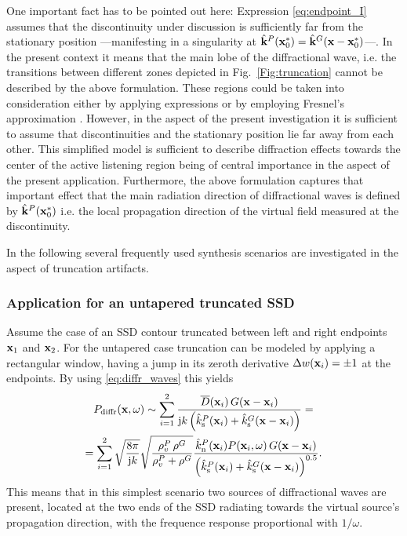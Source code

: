 \documentclass[lettersize,journal]{IEEEtran}
\begin{document}
One important fact has to be pointed out here: 
Expression \eqref{eq:endpoint_I} assumes that the discontinuity under discussion is sufficiently far from the stationary position ---manifesting in a singularity at $\hat{\mathbf{k}}^P(\mathbf{x}_0^*) = \hat{\mathbf{k}}^G(\mathbf{x}-\mathbf{x}_0^*)$---.
In the present context it means that the main lobe of the diffractional wave, i.e. the transitions between different zones depicted in Fig.~\ref{Fig:truncation} cannot be described by the above formulation.
These regions could be taken into consideration either by applying expressions \cite[Eq. 2.7.12 and 2.7.17]{Bleistein1984} or by employing Fresnel's approximation \cite[Sec.4.3.2]{Start1997:phd}.
However, in the aspect of the present investigation it is sufficient to assume that discontinuities and the stationary position lie far away from each other.
This simplified model is sufficient to describe diffraction effects towards the center of the active listening region being of central importance in the aspect of the present application.
Furthermore, the above formulation captures that important effect that the main radiation direction of diffractional waves is defined by $\hat{\mathbf{k}}^P(\mathbf{x}_0^*)$ i.e. the local propagation direction of the virtual field measured at the discontinuity.

In the following several frequently used synthesis scenarios are investigated in the aspect of truncation artifacts.

\subsubsection{Application for an untapered truncated SSD}
Assume the case of an SSD contour truncated between left and right endpoints $\mathbf{x}_1 $ and $\mathbf{x}_2$.
For the untapered case truncation can be modeled by applying a rectangular window, having a jump in its zeroth derivative $\Delta w(\mathbf{x}_i) = \pm 1$ at the endpoints.
By using \eqref{eq:diffr_waves} this yields 
{\fontsize{9pt}{\baselineskip}
\selectfont
\begin{multline}
  \small
  P_{\mathrm{diffr}}(\mathbf{x},\omega) \sim \sum_{i = 1}^{2}  \frac{\overline{D}(\mathbf{x}_i) \, G(\mathbf{x}-\mathbf{x}_i)}{\mathrm{j} k \left(\hat{k}_\mathrm{s}^P(\mathbf{x}_i)+\hat{k}_\mathrm{s}^G(\mathbf{x}-\mathbf{x}_i)\right)}   
  = \\=
   \sum_{i = 1}^{2} \sqrt{ \frac{8 \pi}{\mathrm{j} k} }\sqrt{\frac{ \rho^P_v \, \rho^G }{ \rho^P_v + \rho^G} } \frac{  \hat{k}_\mathrm{n}^P(\mathbf{x}_i) P(\mathbf{x}_i, \omega) \, G(\mathbf{x}-\mathbf{x}_i)}{ \left(\hat{k}_\mathrm{s}^P(\mathbf{x}_i)+\hat{k}_\mathrm{s}^G(\mathbf{x}-\mathbf{x}_i)\right)^{0.5}}.
\end{multline}}
This means that in this simplest scenario two sources of diffractional waves are present, located at the two ends of the SSD radiating towards the virtual source's propagation direction, with the frequence response proportional with $1/\omega$.
\end{document}
